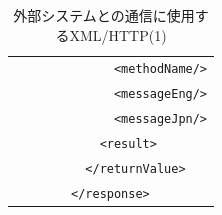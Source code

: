 \documentclass[a4j,10pt,dvips,onecolumn,oneside,final]{jarticle}%
\begin{document}
\begin{table}[htbp]
\begin{center}
{\begin{tabular}{|c|c|c|c|l|}
                  &           &      &                                            & \verb|      <methodName/>|\\ 
                  &           &      &                                            & \verb|      <messageEng/>|\\ 
                  &           &      &                                            & \verb|      <messageJpn/>|\\ 
                  &           &      &                                            & \verb|    <result>|\\
                  &           &      &                                            & \verb|  </returnValue>|\\ 
                  &           &      &                                            & \verb|</response>|\\ \hline
    \end{tabular}
    \caption{外部システムとの通信に使用するXML/HTTP(1)}\label{http1.tab}
}
\end{center}
\end{table}
\end{document}
